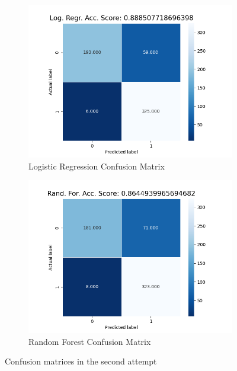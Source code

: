 \documentclass[10pt, conference]{IEEEtran}
\begin{document}
\begin{figure}[t]
    \centering
    \begin{subfigure}[b]{.45\linewidth}
        \centering
        \includegraphics[width=\linewidth]{resources/confusion_matrix_in-out_features_logreg.png}
        \caption{Logistic Regression Confusion Matrix}
        \label{fig:confusion-matrix-second-attempt-randfor}
    \end{subfigure}%
    \begin{subfigure}[b]{.45\linewidth}
        \centering
        \includegraphics[width=\linewidth]{resources/confusion_matrix_in-out_features_randfor.png}
        \caption{Random Forest Confusion Matrix}
        \label{fig:confusion-matrix-second-attempt-logreg}
    \end{subfigure}
    \caption{Confusion matrices in the second attempt}
    \label{fig:confusion-matrix-second-attempt}
\end{figure}
\end{document}
